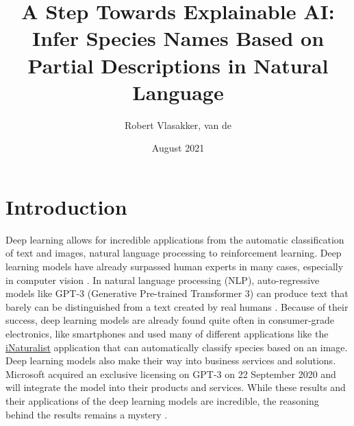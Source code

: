 \documentclass{article}
\title{A Step Towards Explainable AI: Infer Species Names Based on Partial Descriptions in Natural Language}
\author{Robert Vlasakker, van de}
\date{August 2021}
\begin{document}
\graphicspath{ {./figures/} }

\maketitle


\section{Introduction}
Deep learning allows for incredible applications from the automatic classification of text and images, natural language processing to reinforcement learning.
Deep learning models have already surpassed human experts in many cases, especially in computer vision \autocite{he_delving_2015}.
In natural language processing (NLP), auto-regressive models like GPT-3 (Generative Pre-trained Transformer 3) can produce text that barely can be distinguished from a text created by real humans \autocite{brown_language_2020}.
Because of their success, deep learning models are already found quite often in consumer-grade electronics, like smartphones and used many of different applications like the \href{https://www.inaturalist.org/}{iNaturalist} application that can automatically classify species based on an image.
Deep learning models also make their way into business services and solutions.
Microsoft acquired an exclusive licensing on GPT-3 on 22 September 2020 and will integrate the model into their products and services.
While these results and their applications of the deep learning models are incredible, the reasoning behind the results remains a mystery \autocite{li_interpretable_2021, losch_interpretability_2019}.
\end{document}
